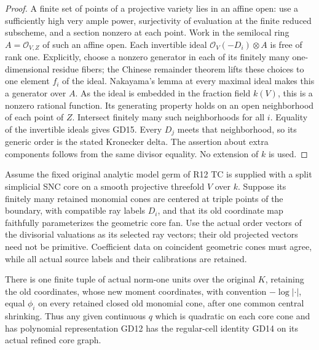 \begin{proof}
A finite set of points of a projective variety lies in an
affine open: use a sufficiently high very ample power,
surjectivity of evaluation at the finite reduced subscheme,
and a section nonzero at each point.  Work in the semilocal
ring \(A=\mathcal O_{V,Z}\) of such an affine open.
Each invertible ideal \(\mathcal O_V(-D_i)\otimes A\)
is free of rank one.  Explicitly, choose a nonzero generator
in each of its finitely many one-dimensional residue
fibers; the Chinese remainder theorem lifts these choices
to one element \(f_i\) of the ideal.  Nakayama's lemma
at every maximal ideal makes this a generator over \(A\).
As the ideal is embedded in the fraction field \(k(V)\),
this is a nonzero rational function.  Its generating
property holds on an open neighborhood of each point of
\(Z\).  Intersect finitely many such neighborhoods for
all \(i\).  Equality of the invertible ideals gives GD15.
Every \(D_j\) meets that neighborhood, so its generic
order is the stated Kronecker delta.  The assertion about
extra components follows from the same divisor equality.
No extension of \(k\) is used.
\end{proof}

\begin{corollary}
\label{cor:r13-actual-hats-on-supplied-snc-core}
Assume the fixed original analytic model germ of R12 TC
is supplied with a split simplicial SNC core on a smooth
projective threefold \(V\) over \(k\).  Suppose its
finitely many retained monomial cones are centered at
triple points of the boundary, with compatible ray labels
\(D_i\), and that its old coordinate map faithfully
parameterizes the geometric core fan.  Use the actual
order vectors of the divisorial valuations as its selected
ray vectors; their old projected vectors need not be
primitive.  Coefficient data on coincident geometric cones
must agree, while all actual source labels and their
calibrations are retained.

There is one finite tuple of actual norm-one units over
the original \(K\), retaining the old coordinates, whose
new moment coordinates, with convention \(-\log|\cdot|\),
equal \(\phi_i\) on every retained
closed old monomial cone, after one common central
shrinking.  Thus any given continuous \(q\) which is quadratic on
each core cone and has polynomial representation GD12 has
the regular-cell identity GD14 on its actual refined
core graph.
\end{corollary}

